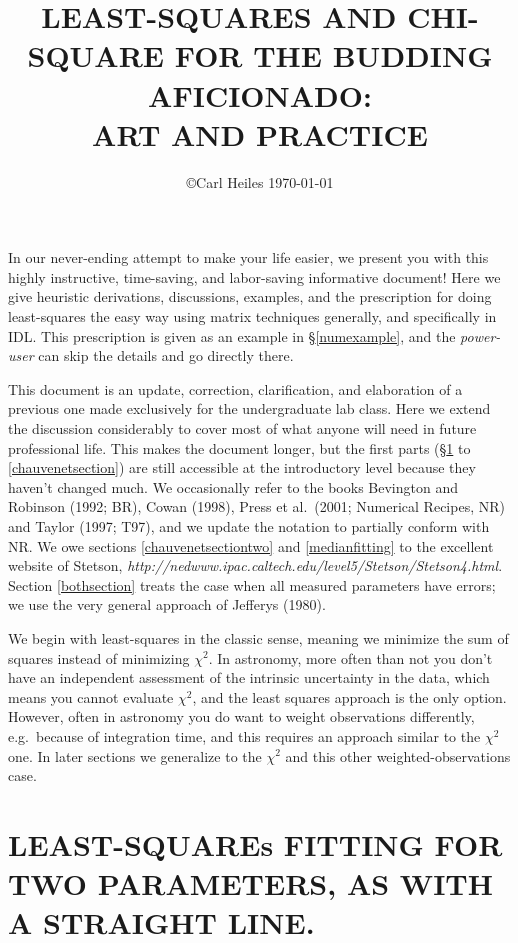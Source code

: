 \documentclass[psfig,preprint]{aastex}
\begin{document}
\setcounter{section}{-1}

\title{LEAST-SQUARES AND CHI-SQUARE FOR THE BUDDING AFICIONADO: \\ 
ART AND PRACTICE } 

\author{\copyright Carl Heiles \today }

	In our never-ending attempt to make your life easier, we present
you with this highly instructive, time-saving, and labor-saving
informative document! Here we give heuristic derivations, discussions,
examples, and the prescription for doing least-squares the easy way
using matrix techniques generally, and specifically in IDL.  This
prescription is given as an example in \S\ref{numexample},  and the {\it
power-user} can skip the details and go directly there.  

	This document is an update, correction, clarification, and
elaboration of a previous one made exclusively for the undergraduate lab
class. Here we extend the discussion considerably to cover most of what
anyone will need in future professional life. This makes the document
longer, but the first parts (\S \ref{sectionone} to
\ref{chauvenetsection}) are still accessible at the introductory level
because they haven't changed much. We occasionally refer to the books
Bevington and Robinson (1992; BR), Cowan (1998),  Press et al.\ (2001;
Numerical Recipes, NR) and Taylor (1997; T97), and we update the
notation to partially conform with NR. We owe sections
\ref{chauvenetsectiontwo} and \ref{medianfitting} to the 
excellent website of Stetson, {\it
http://nedwww.ipac.caltech.edu/level5/Stetson/Stetson4.html}.
Section \ref{bothsection} treats the case when all measured parameters
have errors; we use the very general approach of Jefferys  (1980).

	We begin with least-squares in the classic sense, meaning we
minimize the sum of squares instead of minimizing $\chi^2$.   In
astronomy,  more often than not you don't have an independent assessment
of the intrinsic uncertainty in the data, which means you cannot
evaluate $\chi^2$, and the least squares  approach is the only option.
However, often in astronomy you do want to weight observations
differently, e.g.\ because of integration time, and this requires an
approach similar to the $\chi^2$ one. In later sections we generalize to
the $\chi^2$ and this other weighted-observations case.

\tableofcontents

\section{LEAST-SQUAREs FITTING FOR TWO PARAMETERS, AS WITH A STRAIGHT
LINE.} \label{sectionone}
\end{document}
